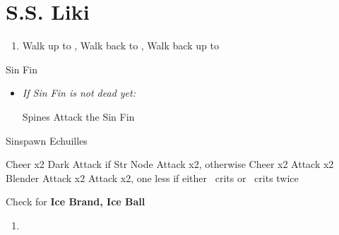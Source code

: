 \chapter{S.S. Liki}

\begin{enumerate}
    \item Walk up to \yuna, Walk back to \wakka, Walk back up to \yuna
\end{enumerate}
\begin{battle}[2000]{Sin Fin}
    \begin{itemize}
        \tidusf Defend
        \switch{\yuna}{\lulu}
        \luluf Thunder the Sin Fin
        \switch{\kimahri}{\yuna}
        \summon{\valefor}
        \valeforf Energy Ray \od\ on Sin Fin
        \enemyf Move x2 and Spines x2
        \valeforf Thunder the Sin Fin
        \enemyf Spines and Move
        \valeforf Thunder the Sin Fin x2
        \item \textit{If Sin Fin is not dead yet:}
        \begin{itemize}
            \enemyf Spines
            \switch{\tidus}{\wakka}
            \wakkaf Attack the Sin Fin
        \end{itemize}
    \end{itemize}
\end{battle}
\begin{battle}[2000]{Sinspawn Echuilles}
    \begin{itemize}
        \tidusf Cheer x2
        \wakkaf Dark Attack
        \tidusf if Str Node Attack x2, otherwise Cheer x2
        \wakkaf Attack x2
        \enemyf Blender
        \wakkaf Attack x2
        \tidusf Attack x2, one less if either \tidus\ crits or \wakka\ crits twice
        \tidusf \od
    \end{itemize}
    Check for \textbf{Ice Brand, Ice Ball}
\end{battle}
\begin{enumerate}[resume]
    \item \skippablefmv
\end{enumerate}
\wincb\losscb\bothcb\winnpsingle\lossnpsingle\bothnpsingle
